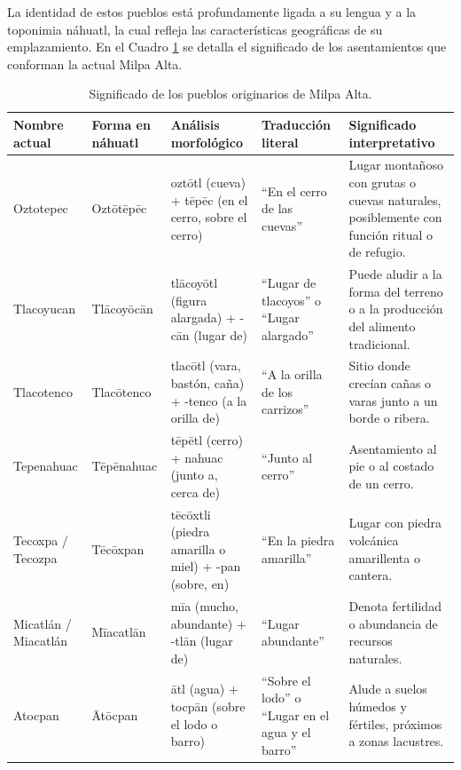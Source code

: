 La identidad de estos pueblos está profundamente ligada a su lengua y a la toponimia náhuatl, 
la cual refleja las características geográficas de su emplazamiento. En el Cuadro 
\ref{tab:pueblos_milpa_alta} se detalla el significado de los asentamientos que 
conforman la actual Milpa Alta.

\begin{table}[H]
    \centering
    \caption[Significado de los pueblos originarios de Milpa Alta]
    {Significado de los pueblos originarios de Milpa Alta.}
    \label{tab:pueblos_milpa_alta}
    \fontsize{9pt}{11pt}\selectfont %
    \begin{tabularx}{\textwidth}{l l X X X}
        \toprule
        \textbf{Nombre actual} & \textbf{Forma en náhuatl} & \textbf{Análisis morfológico} & \textbf{Traducción literal} & \textbf{Significado interpretativo} \\
        \midrule
        Oztotepec & Oztōtēpēc & oztōtl (cueva) + tēpēc (en el cerro, sobre el cerro) & ``En el cerro de las cuevas'' & Lugar montañoso con grutas o cuevas naturales, posiblemente con función ritual o de refugio. \\
        \addlinespace
        Tlacoyucan & Tlācoyōcān & tlācoyōtl (figura alargada) + -cān (lugar de) & ``Lugar de tlacoyos'' o ``Lugar alargado'' & Puede aludir a la forma del terreno o a la producción del alimento tradicional. \\
        \addlinespace
        Tlacotenco & Tlacōtenco & tlacōtl (vara, bastón, caña) + -tenco (a la orilla de) & ``A la orilla de los carrizos'' & Sitio donde crecían cañas o varas junto a un borde o ribera. \\
        \addlinespace
        Tepenahuac & Tēpēnahuac & tēpētl (cerro) + nahuac (junto a, cerca de) & ``Junto al cerro'' & Asentamiento al pie o al costado de un cerro. \\
        \addlinespace
        Tecoxpa / Tecozpa & Tēcōxpan & tēcōxtli (piedra amarilla o miel) + -pan (sobre, en) & ``En la piedra amarilla'' & Lugar con piedra volcánica amarillenta o cantera. \\
        \addlinespace
        Micatlán / Miacatlán & Mīacatlān & mīa (mucho, abundante) + -tlān (lugar de) & ``Lugar abundante'' & Denota fertilidad o abundancia de recursos naturales. \\
        \addlinespace
        Atocpan & Ātōcpan & ātl (agua) + tocpān (sobre el lodo o barro) & ``Sobre el lodo'' o ``Lugar en el agua y el barro'' & Alude a suelos húmedos y fértiles, próximos a zonas lacustres. \\

\end{tabularx}
\end{table}
